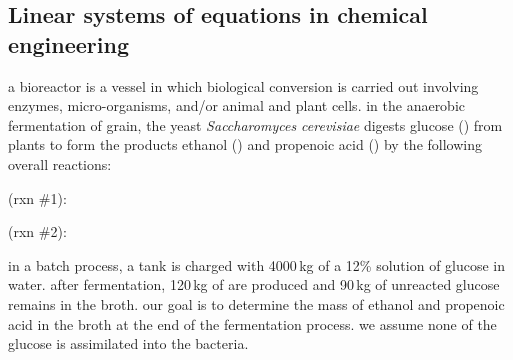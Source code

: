 \documentclass[addpoints]{exam}
\begin{document}
\begin{questions}
	\subsection*{Linear systems of equations in chemical engineering}
 	\question a bioreactor is a vessel in which biological conversion is carried out involving enzymes, micro-organisms, and/or animal and plant cells.
	in the anaerobic fermentation of grain, the yeast \emph{Saccharomyces cerevisiae} digests glucose () from plants to form the products ethanol () and propenoic acid () by the following overall reactions:
	
	\hspace{2em} (rxn \#1): 
	
	\hspace{2em} (rxn \#2): 
	
	in a batch process, a tank is charged with 4000\,kg of a 12\% solution of glucose in water. after fermentation, 120\,kg of  are produced and 90\,kg of unreacted glucose remains in the broth. 
	our goal is to determine the mass of ethanol and propenoic acid in the broth at the end of the fermentation process.
	we assume none of the glucose is assimilated into the bacteria.
	
\end{questions}
\end{document}
